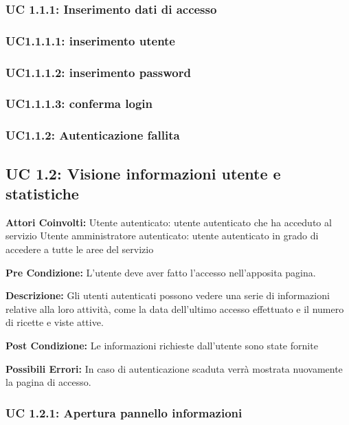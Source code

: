 \subsubsection{UC 1.1.1: Inserimento dati di accesso}

\subsubsection{UC1.1.1.1: inserimento utente}

\subsubsection{UC1.1.1.2: inserimento password}

\subsubsection{UC1.1.1.3: conferma login}

\subsubsection{UC1.1.2: Autenticazione fallita}



\subsection{UC 1.2: Visione informazioni utente e statistiche}

\textbf{Attori Coinvolti:}
Utente autenticato: utente autenticato che ha acceduto al servizio
Utente amministratore autenticato: utente autenticato in grado di accedere a tutte le aree del servizio

\textbf{Pre Condizione:}
L'utente deve aver fatto l'accesso nell'apposita pagina.

\textbf{Descrizione:}
Gli utenti autenticati possono vedere una serie di informazioni relative alla loro attività, come la data dell’ultimo accesso effettuato e il numero di ricette e viste attive.

\textbf{Post Condizione:}
Le informazioni richieste dall'utente sono state fornite

\textbf{Possibili Errori:}
In caso di autenticazione scaduta verrà mostrata nuovamente la pagina di accesso.


\subsubsection{UC 1.2.1: Apertura pannello informazioni}

